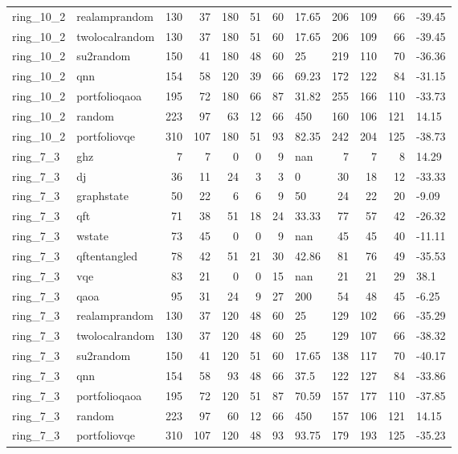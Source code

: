 \begin{longtable}{llrrrrrlrrrl}
ring\_10\_2 & realamprandom & 130 & 37 & 180 & 51 & 60 & 17.65 & 206 & 109 & 66 & -39.45 \\
ring\_10\_2 & twolocalrandom & 130 & 37 & 180 & 51 & 60 & 17.65 & 206 & 109 & 66 & -39.45 \\
ring\_10\_2 & su2random & 150 & 41 & 180 & 48 & 60 & 25 & 219 & 110 & 70 & -36.36 \\
ring\_10\_2 & qnn & 154 & 58 & 120 & 39 & 66 & 69.23 & 172 & 122 & 84 & -31.15 \\
ring\_10\_2 & portfolioqaoa & 195 & 72 & 180 & 66 & 87 & 31.82 & 255 & 166 & 110 & -33.73 \\
ring\_10\_2 & random & 223 & 97 & 63 & 12 & 66 & 450 & 160 & 106 & 121 & 14.15 \\
ring\_10\_2 & portfoliovqe & 310 & 107 & 180 & 51 & 93 & 82.35 & 242 & 204 & 125 & -38.73 \\
ring\_7\_3 & ghz & 7 & 7 & 0 & 0 & 9 & nan & 7 & 7 & 8 & 14.29 \\
ring\_7\_3 & dj & 36 & 11 & 24 & 3 & 3 & 0 & 30 & 18 & 12 & -33.33 \\
ring\_7\_3 & graphstate & 50 & 22 & 6 & 6 & 9 & 50 & 24 & 22 & 20 & -9.09 \\
ring\_7\_3 & qft & 71 & 38 & 51 & 18 & 24 & 33.33 & 77 & 57 & 42 & -26.32 \\
ring\_7\_3 & wstate & 73 & 45 & 0 & 0 & 9 & nan & 45 & 45 & 40 & -11.11 \\
ring\_7\_3 & qftentangled & 78 & 42 & 51 & 21 & 30 & 42.86 & 81 & 76 & 49 & -35.53 \\
ring\_7\_3 & vqe & 83 & 21 & 0 & 0 & 15 & nan & 21 & 21 & 29 & 38.1 \\
ring\_7\_3 & qaoa & 95 & 31 & 24 & 9 & 27 & 200 & 54 & 48 & 45 & -6.25 \\
ring\_7\_3 & realamprandom & 130 & 37 & 120 & 48 & 60 & 25 & 129 & 102 & 66 & -35.29 \\
ring\_7\_3 & twolocalrandom & 130 & 37 & 120 & 48 & 60 & 25 & 129 & 107 & 66 & -38.32 \\
ring\_7\_3 & su2random & 150 & 41 & 120 & 51 & 60 & 17.65 & 138 & 117 & 70 & -40.17 \\
ring\_7\_3 & qnn & 154 & 58 & 93 & 48 & 66 & 37.5 & 122 & 127 & 84 & -33.86 \\
ring\_7\_3 & portfolioqaoa & 195 & 72 & 120 & 51 & 87 & 70.59 & 157 & 177 & 110 & -37.85 \\
ring\_7\_3 & random & 223 & 97 & 60 & 12 & 66 & 450 & 157 & 106 & 121 & 14.15 \\
ring\_7\_3 & portfoliovqe & 310 & 107 & 120 & 48 & 93 & 93.75 & 179 & 193 & 125 & -35.23 \\

\end{longtable}
